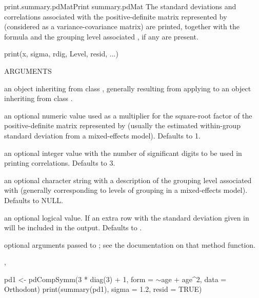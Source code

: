 \documentclass[pdftex]{article} \usepackage{url,graphicx}
\renewcommand{\Twiddle}{\mbox{\(\sim\)}}
\begin{document}
\begin{Helpfile}{print.summary.pdMat}{Print summary.pdMat}
The standard deviations and correlations associated with the
positive-definite matrix represented by  (considered as a
variance-covariance matrix) are printed, together with the formula and
the grouping level associated , if any are present.
\begin{Example}
print(x, sigma, rdig, Level, resid, ...)
\end{Example}
\begin{Argument}{ARGUMENTS}
\item[\Co{x:}]
an object inheriting from class ,
generally resulting from applying  to an object
inheriting from class .
\item[\Co{sigma:}]
an optional numeric value used as a multiplier for
the square-root factor of the positive-definite matrix represented by
 (usually the estimated within-group standard deviation
from a mixed-effects model). Defaults to 1.
\item[\Co{rdig:}]
an optional integer value with the number of significant
digits to be used in printing correlations. Defaults to 3.
\item[\Co{Level:}]
an optional character string with a description of the
grouping level associated with  (generally corresponding
to levels of grouping in a mixed-effects model). Defaults to NULL.
\item[\Co{resid:}]
an optional logical value. If  an extra row
with the  standard deviation given in 
will be included in the output. Defaults to .
\item[\Co{...:}]
optional arguments passed to ; see
the documentation on that method function.
\end{Argument}
,
\need 15pt
\vspace{-16pt} 
\begin{Example}
pd1 <- pdCompSymm(3 * diag(3) + 1, form = \Twiddle age + age^2,
         data = Orthodont)
print(summary(pd1), sigma = 1.2, resid = TRUE)
\end{Example}
\end{Helpfile}
\end{document}
